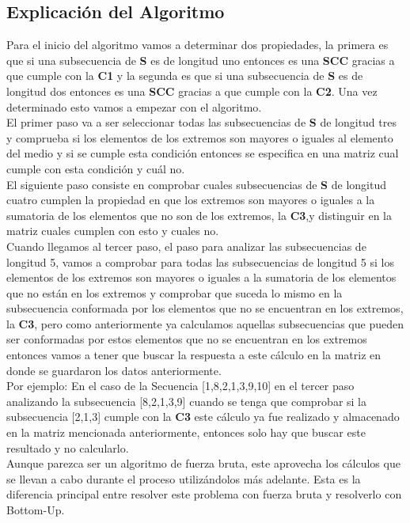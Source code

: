 \documentclass[10pt]{article}
\begin{document}
	\subsection*{Explicaci\'on del Algoritmo}
Para el inicio del algoritmo vamos a determinar dos propiedades, la primera es que si una subsecuencia de \textbf{S} es de longitud uno entonces es una \textbf{SCC} gracias a que cumple con la \textbf{C1} y la segunda es que si una subsecuencia de \textbf{S} es de longitud dos entonces es una \textbf{SCC} gracias a que cumple con la \textbf{C2}. Una vez determinado esto vamos a empezar con el algoritmo.\\
El primer paso va a ser seleccionar todas las subsecuencias de \textbf{S} de longitud tres y comprueba si los elementos de los extremos son mayores o iguales al elemento del medio  y si se cumple esta condici\'on entonces se especifica en una matriz cual cumple con esta condici\'on y cu\'al no.\\
El siguiente paso consiste en comprobar cuales subsecuencias de \textbf{S} de longitud cuatro cumplen la propiedad en que los extremos son mayores o iguales a la sumatoria de los elementos que no son de los extremos, la \textbf{C3},y distinguir en la matriz cuales cumplen con esto y cuales no.\\
Cuando llegamos al tercer paso, el paso para analizar las subsecuencias de longitud 5, vamos a comprobar para todas las subsecuencias de longitud 5 si los elementos de los extremos son mayores o iguales a la sumatoria de los elementos que no est\'an en los extremos y comprobar que suceda lo mismo en la subsecuencia conformada por los elementos que no se encuentran en los extremos, la \textbf{C3},  pero como anteriormente ya calculamos aquellas subsecuencias que pueden ser conformadas por estos elementos que no se encuentran en los extremos entonces vamos a tener que buscar la respuesta a este c\'alculo en la matriz en donde se guardaron los datos anteriormente.\\
Por ejemplo: En el caso de la Secuencia [1,8,2,1,3,9,10] en el tercer paso analizando la subsecuencia [8,2,1,3,9] cuando se tenga que comprobar si la subsecuencia [2,1,3] cumple con la \textbf{C3} este c\'alculo ya fue realizado y almacenado en la matriz mencionada anteriormente, entonces solo hay que buscar este resultado y no calcularlo.\\

Aunque parezca ser un algoritmo de fuerza bruta, este aprovecha los c\'alculos que se llevan a cabo durante el proceso utiliz\'andolos m\'as adelante. Esta es la diferencia principal entre resolver este problema con fuerza bruta y resolverlo con Bottom-Up.
\end{document}
